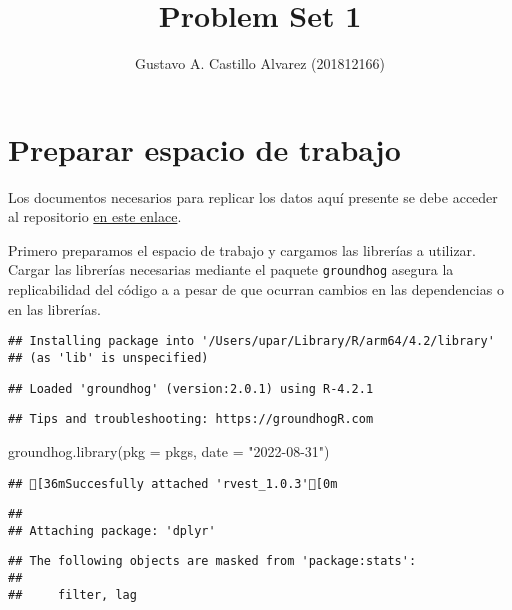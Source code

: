 \documentclass[
]{article}
\title{Problem Set 1}
\author{Gustavo A. Castillo Alvarez (201812166)}
\date{}
\newenvironment{Shaded}{\begin{snugshade}}{\end{snugshade}}
\newcommand{\AttributeTok}[1]{\textcolor[rgb]{0.77,0.63,0.00}{#1}}
\newcommand{\FunctionTok}[1]{\textcolor[rgb]{0.00,0.00,0.00}{#1}}
\newcommand{\NormalTok}[1]{#1}
\newcommand{\StringTok}[1]{\textcolor[rgb]{0.31,0.60,0.02}{#1}}
\begin{document}
\maketitle

\hypertarget{preparar-espacio-de-trabajo}{%
\section{Preparar espacio de
trabajo}\label{preparar-espacio-de-trabajo}}

Los documentos necesarios para replicar los datos aquí presente se debe
acceder al repositorio \href{https://github.com/bob-ortiz/BDML-ps1}{en
este enlace}.

Primero preparamos el espacio de trabajo y cargamos las librerías a
utilizar. Cargar las librerías necesarias mediante el paquete
\texttt{groundhog} asegura la replicabilidad del código a a pesar de que
ocurran cambios en las dependencias o en las librerías.

\begin{verbatim}
## Installing package into '/Users/upar/Library/R/arm64/4.2/library'
## (as 'lib' is unspecified)
\end{verbatim}

\begin{verbatim}
## Loaded 'groundhog' (version:2.0.1) using R-4.2.1
\end{verbatim}

\begin{verbatim}
## Tips and troubleshooting: https://groundhogR.com
\end{verbatim}

\begin{Shaded}
\begin{Highlighting}[]
\FunctionTok{groundhog.library}\NormalTok{(}\AttributeTok{pkg =}\NormalTok{ pkgs, }\AttributeTok{date =} \StringTok{"2022{-}08{-}31"}\NormalTok{)}
\end{Highlighting}
\end{Shaded}

\begin{verbatim}
## [36mSuccesfully attached 'rvest_1.0.3'[0m
\end{verbatim}

\begin{verbatim}
## 
## Attaching package: 'dplyr'
\end{verbatim}

\begin{verbatim}
## The following objects are masked from 'package:stats':
## 
##     filter, lag
\end{verbatim}
\end{document}
